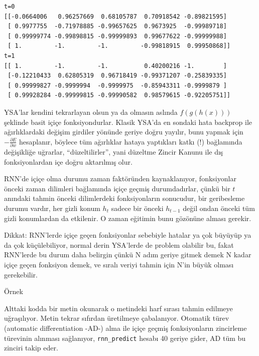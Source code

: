 \documentclass[12pt,fleqn]{article}\usepackage{../../common}
\begin{document}
\begin{verbatim}
t=0
[[-0.0664006   0.96257669  0.68105787  0.70918542 -0.89821595]
 [ 0.9977755  -0.71978885 -0.99657625  0.9673925  -0.99989718]
 [ 0.99999774 -0.99898815 -0.99999893  0.99677622 -0.99999988]
 [ 1.         -1.         -1.         -0.99818915  0.99950868]]
t=1
[[ 1.         -1.         -1.          0.40200216 -1.        ]
 [-0.12210433  0.62805319  0.96718419 -0.99371207 -0.25839335]
 [ 0.99999827 -0.9999994  -0.9999975  -0.85943311 -0.9999879 ]
 [ 0.99928284 -0.99999815 -0.99990582  0.98579615 -0.92205751]]
\end{verbatim}

YSA'lar kendini tekrarlayan olsun ya da olmasın aslında $f(g(h(x)))$
şeklinde basit içiçe fonksiyondurlar. Klasik YSA'da en sondaki hata
backprop ile ağırlıklardaki değişim girdiler yönünde geriye doğru yayılır,
bunu yapmak için $-\frac{\partial E}{\partial w}$ hesaplanır, böylece tüm
ağırlıklar hataya yaptıkları katkı (!) bağlamında değişikliğe uğrarlar,
``düzeltilirler'', yani düzeltme Zincir Kanunu ile dış fonksiyonlardan içe
doğru aktarılmış olur.

RNN'de içiçe olma durumu zaman faktöründen kaynaklanıyor, fonksiyonlar
önceki zaman dilimleri bağlamında içiçe geçmiş durumdadırlar, çünkü bir $t$
anındaki tahmin önceki dilimlerdeki fonksiyonların sonucudur, bir
geribesleme durumu vardır, her gizli konum $h_t$ sadece bir önceki
$h_{t-1}$ değil ondan önceki tüm gizli konumlardan da etkilenir. O zaman
eğitimin bunu gözönüne alması gerekir.

Dikkat: RNN'lerde içiçe geçen fonksiyonlar sebebiyle hatalar ya çok büyüyüp
ya da çok küçülebiliyor, normal derin YSA'lerde de problem olabilir bu,
fakat RNN'lerde bu durum daha belirgin çünkü N adım geriye gitmek demek N
kadar içiçe geçen fonksiyon demek, ve sıralı veriyi tahmin için N'in büyük
olması gerekebilir.

Örnek

Alttaki kodda bir metin okunarak o metindeki harf sırası tahmin edilmeye
uğraşılıyor. Metin tekrar sıfırdan üretilmeye çabalanıyor. Otomatik türev
(automatic differentiation -AD-) alma ile içiçe geçmiş fonksiyonların
zincirleme türevinin alınması sağlanıyor, \verb!rnn_predict! hesabı 40
geriye gider, AD tüm bu zinciri takip eder.

\inputminted[fontsize=\footnotesize]{python}{rnn.py}
\end{document}

